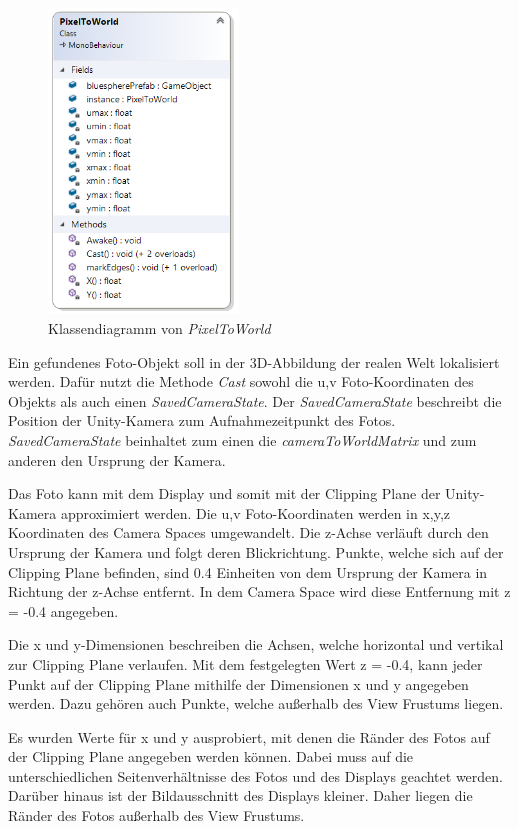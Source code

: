 \begin{figure}[H]
	\centering
	\includegraphics[width=0.45\textwidth]{images/dia_pixeltoworld.PNG}
	\caption[Klassendiagramm von \textit{PixelToWorld}]{Klassendiagramm von \textit{PixelToWorld}}
	\label{dia:pixeltoworld}
\end{figure}

Ein gefundenes Foto-Objekt soll in der 3D-Abbildung der realen Welt lokalisiert werden. Dafür nutzt die Methode \textit{Cast} sowohl die u,v Foto-Koordinaten des Objekts als auch einen \textit{SavedCameraState}. Der \textit{SavedCameraState} beschreibt die Position der Unity-Kamera zum Aufnahmezeitpunkt des Fotos.  \textit{SavedCameraState} beinhaltet zum einen die \textit{cameraToWorldMatrix} und zum anderen den Ursprung der Kamera.

Das Foto kann mit dem Display und somit mit der Clipping Plane der Unity-Kamera approximiert werden.
Die u,v Foto-Koordinaten werden in x,y,z Koordinaten des Camera Spaces umgewandelt. Die z-Achse verläuft durch den Ursprung der Kamera und folgt deren Blickrichtung. Punkte, welche sich auf der Clipping Plane befinden, sind 0.4 Einheiten von dem Ursprung der Kamera in Richtung der z-Achse entfernt. In dem Camera Space wird diese Entfernung mit z = -0.4 angegeben. 

Die x und y-Dimensionen beschreiben die Achsen, welche horizontal und vertikal zur Clipping Plane verlaufen. Mit dem festgelegten Wert z = -0.4, kann jeder Punkt auf der Clipping Plane mithilfe der Dimensionen x und y angegeben werden. Dazu gehören auch Punkte, welche außerhalb des View Frustums liegen.

Es wurden Werte für x und y ausprobiert, mit denen die Ränder des Fotos auf der Clipping Plane angegeben werden können. Dabei muss auf die unterschiedlichen Seitenverhältnisse des Fotos und des Displays geachtet werden. Darüber hinaus ist der Bildausschnitt des Displays kleiner. Daher liegen die Ränder des Fotos außerhalb des View Frustums. 

